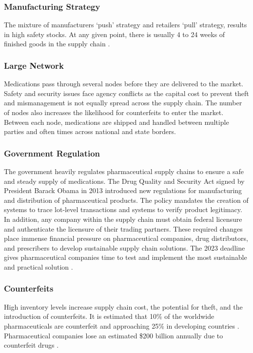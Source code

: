 \documentclass[sigconf]{acmart}
\begin{document}
\subsubsection{Manufacturing Strategy} The mixture of manufacturers `push' strategy and retailers `pull' strategy, results in high safety stocks. At any given point, there is usually 4 to 24 weeks of finished goods in the supply chain  \cite{Shah01}. 
\subsubsection{Large Network} Medications pass through several nodes before they are delivered to the market. Safety and security issues face agency conflicts as the capital cost to prevent theft and mismanagement is not equally spread across the supply chain. The number of nodes also increases the likelihood for counterfeits to enter the market. Between each node, medications are shipped and handled between multiple parties and often times across national and state borders.

\subsubsection{Government Regulation} The government heavily regulates pharmaceutical supply chains to ensure a safe and steady supply of medications. The Drug Quality and Security Act signed by President Barack Obama in 2013 introduced new regulations for manufacturing and distribution of pharmaceutical products. The policy mandates the creation of systems to trace lot-level transactions and systems to verify product legitimacy. In addition, any company within the supply chain must obtain federal licensure and authenticate the licensure of their trading partners. These required changes place immense financial pressure on pharmaceutical companies, drug distributors, and prescribers to develop sustainable supply chain solutions. The 2023 deadline gives pharmaceutical companies time to test and implement the most sustainable and practical solution \cite{opsis8}.

\subsubsection{Counterfeits} High inventory levels increase supply chain cost, the potential for theft, and the introduction of counterfeits. It is estimated that 10\% of the worldwide pharmaceuticals are counterfeit and approaching 25\% in developing countries \cite{Kelesidis01}. Pharmaceutical companies lose an estimated \$200 billion annually due to counterfeit drugs \cite{das2017}.  
\end{document}
